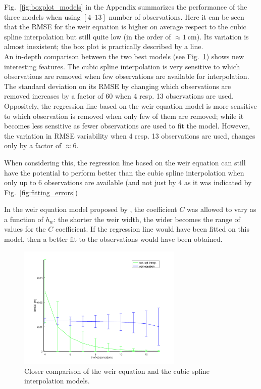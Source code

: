 Fig.~\ref{fig:boxplot_models} in the Appendix summarizes the performance of the three models when using $[\numrange{4}{13}]$ number of observations.
Here it can be seen that the RMSE for the weir equation is higher on average respect to the cubic spline interpolation but still quite low (in the order of $\approx \SI{1}{\centi\meter}$).
Its variation is almost inexistent; the box plot is practically described by a line.\\

An in-depth comparison between the two best models (see Fig.~\ref{fig:fitting_std}) shows new interesting features.
The cubic spline interpolation is very sensitive to which observations are removed when few observations are available for interpolation. The standard deviation on its RMSE by changing which observations are removed increases by a factor of \num{60} when \num{4} resp. \num{13} observations are used.
Oppositely, the regression line based on the weir equation model is more sensitive to which observation is removed when only few of them are removed; while it becomes less sensitive as fewer observations are used to fit the model. However, the variation in RMSE variability  when \num{4} resp. \num{13} observations are used, changes only by a factor of $\approx \num{6}$.

When considering this, the regression line based on the weir equation can still have the potential to perform better than the cubic spline interpolation when only up to \num{6} observations are available (and not just by \num{4} as it was indicated by Fig.~\ref{fig:fitting_errors})

In the weir equation model proposed by \cite{brown_urban_2009}, the coefficient $C$ was allowed to vary as a function of $h_w$:  the shorter the weir width, the wider becomes the range of values for the $C$ coefficient. If the regression line would have been fitted on this model, then a better fit to the observations would have been obtained.

\begin{figure}[h]
  \centering
  \includegraphics[width=0.7\textwidth]{Figures/fitting_std.png}
  \caption{Closer comparison of the weir equation and the cubic spline interpolation models.}
  \label{fig:fitting_std}
\end{figure}


